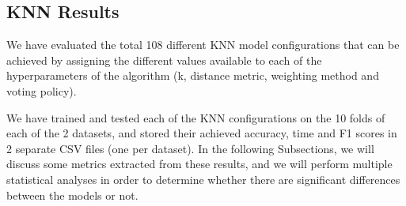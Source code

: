 \subsection{KNN Results}\label{sec:res:knn}
We have evaluated the total 108 different KNN model configurations that can be achieved by assigning the different values available to each of the hyperparameters of the algorithm (k, distance metric, weighting method and voting policy).

We have trained and tested each of the KNN configurations on the 10 folds of each of the 2 datasets, and stored their achieved accuracy, time and F1 scores in 2 separate CSV files (one per dataset). In the following Subsections, we will discuss some metrics extracted from these results, and we will perform multiple statistical analyses in order to determine whether there are significant differences between the models or not.

